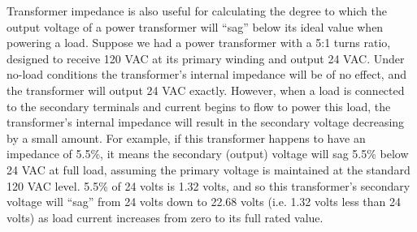 Transformer impedance is also useful for calculating the degree to which the output voltage of a power transformer will ``sag'' below its ideal value when powering a load.  Suppose we had a power transformer with a 5:1 turns ratio, designed to receive 120 VAC at its primary winding and output 24 VAC.  Under no-load conditions the transformer's internal impedance will be of no effect, and the transformer will output 24 VAC exactly.  However, when a load is connected to the secondary terminals and current begins to flow to power this load, the transformer's internal impedance will result in the secondary voltage decreasing by a small amount.  For example, if this transformer happens to have an impedance of 5.5\%, it means the secondary (output) voltage will sag 5.5\% below 24 VAC at full load, assuming the primary voltage is maintained at the standard 120 VAC level.  5.5\% of 24 volts is 1.32 volts, and so this transformer's secondary voltage will ``sag'' from 24 volts down to 22.68 volts (i.e. 1.32 volts less than 24 volts) as load current increases from zero to its full rated value.



































